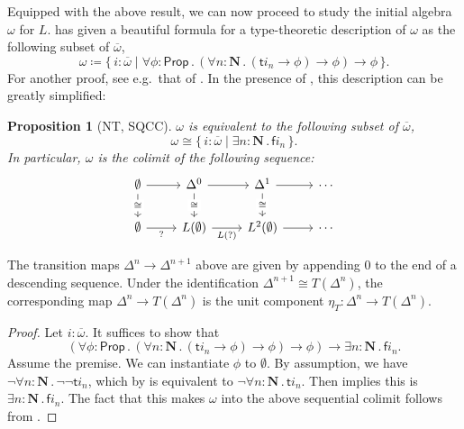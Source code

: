 \documentclass[a4paper,12pt]{amsart}
\newtheorem{proposition}[theorem]{Proposition}
\theoremstyle{definition}
\newcommand{\mb}[1]{\mathbf{#1}}
\newcommand{\ms}[1]{\mathsf{#1}}
\newcommand{\ov}[1]{\overline{#1}}
\newcommand{\scomp}[2]{\{\,#1\mid#2\,\}}
\newcommand{\prth}[1]{\left(#1\right)}
\newcommand{\N}{\mb N}
\newcommand{\fa}[2]{\forall #1\!\colon\!\!#2\mathpunct{.}}
\newcommand{\ex}[2]{\exists #1\!\colon\!\!#2\mathpunct{.}}
\newcommand{\emp}{\emptyset}
\newcommand{\pp}{\ms{Prop}}
\begin{document}
Equipped with the above result, we can now proceed to study the initial algebra $\omega$ for $L$. \citet{JIBLADZE1997185} has given a beautiful formula for a type-theoretic description of $\omega$ as the following subset of $\ov\omega$, 
\[ \omega \coloneq \scomp{i : \ov\omega}{\fa\phi{\pp} (\fa n{\N} (\ms ti_n \to \phi) \to \phi) \to \phi}. \]
For another proof, see e.g.\ that of \citet{VANOOSTEN2000233}. In the presence of , this description can be greatly simplified:

\begin{proposition}[NT, SQCC]\label{prop:omegacolimit}
  $\omega$ is equivalent to the following subset of $\ov\omega$,
  \[ \omega \cong \scomp{i : \ov\omega}{\ex n{\N} \ms fi_n}. \]
  In particular, $\omega$ is the colimit of the following sequence:
    \[\begin{tikzcd}
    \emp & {\Delta^0} & {\Delta^1} & \cdots \\
    \emp & {L(\emp)} & {L^2(\emp)} & \cdots
    \arrow[from=1-1, to=1-2]
    \arrow["\cong"{description}, from=1-1, to=2-1]
    \arrow[from=1-2, to=1-3]
    \arrow["\cong"{description}, from=1-2, to=2-2]
    \arrow[from=1-3, to=1-4]
    \arrow["\cong"{description}, from=1-3, to=2-3]
    \arrow["{?}"', from=2-1, to=2-2]
    \arrow["{L(?)}"', from=2-2, to=2-3]
    \arrow[from=2-3, to=2-4]
  \end{tikzcd}\]
\end{proposition}

The transition maps $\Delta^n\to \Delta^{n+1}$ above are given by appending $0$ to the end of a descending sequence. Under the identification $\Delta^{n+1}\cong T(\Delta^n)$, the corresponding map $\Delta^n\to T(\Delta^n)$ is the unit component $\eta_T\colon \Delta^n\to T(\Delta^{n})$.

\begin{proof}
  Let $i : \ov\omega$. It suffices to show that
  \[ \prth{\fa\phi{\pp} (\fa n{\N} (\ms ti_n \to \phi) \to \phi) \to \phi} \to \ex{n}\N \ms fi_n. \]
  Assume the premise. We can instantiate $\phi$ to $\emp$. By assumption, we have $\neg\fa n\N \neg\neg\ms ti_n$, which by  is equivalent to $\neg\fa n\N \ms ti_n$. Then  implies this is $\ex n\N \ms fi_n$. The fact that this makes $\omega$ into the above sequential colimit follows from \citet[Cor.~1.10]{VANOOSTEN2000233}.
\end{proof}
\end{document}
